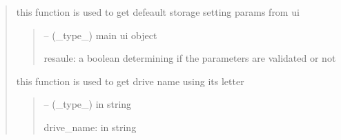 \documentclass[letterpaper,10pt,english]{sphinxmanual}
\begin{document}
\begin{quote}
\begin{savenotes}\begin{fulllineitems}
\label{\detokenize{setting/backend/storage_funcs:oxin.backend.storage_funcs.get_camera_live_drive_parameters_from_ui}}
\pysigstartsignatures
{}
\pysigstopsignatures
\sphinxAtStartPar
this function is used to get defeault storage setting params from ui
\begin{quote}\begin{description}
\sphinxAtStartPar
{} – (\_type\_) main ui object

\sphinxAtStartPar
resaule: a boolean determining if the parameters are validated or not

\end{description}\end{quote}

\end{fulllineitems}\end{savenotes}


\begin{savenotes}\begin{fulllineitems}
\label{\detokenize{setting/backend/storage_funcs:oxin.backend.storage_funcs.get_drivename}}
\pysigstartsignatures
{}
\pysigstopsignatures
\sphinxAtStartPar
this function is used to get drive name using its letter
\begin{quote}\begin{description}
\sphinxAtStartPar
{} – (\_type\_) in string

\sphinxAtStartPar
drive\_name: in string

\end{description}\end{quote}

\end{fulllineitems}\end{savenotes}


\end{quote}
\end{document}
